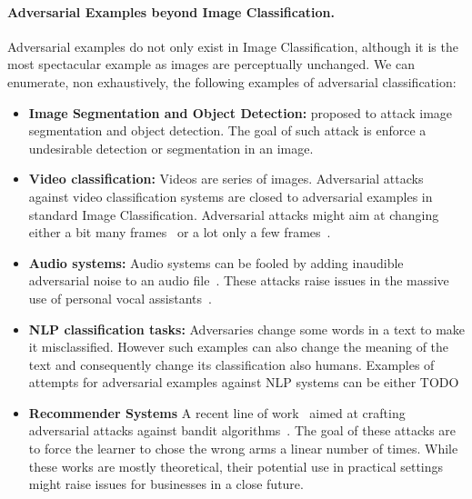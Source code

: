 \paragraph{Adversarial Examples beyond Image Classification.} Adversarial examples do not only exist in Image Classification, although it is the most spectacular example as images are perceptually unchanged. We can enumerate, non exhaustively, the following examples of adversarial classification:
\begin{itemize}
    \item \textbf{Image Segmentation and Object Detection:} \cite{xie2017adversarial} proposed to attack image segmentation and object detection. The goal of such attack is enforce a undesirable detection or segmentation in an image. 
    \item \textbf{Video classification:} Videos are series of images. Adversarial attacks against video classification systems are closed to adversarial examples in standard Image Classification. Adversarial attacks might aim at changing either a bit many frames~\citep{jiang2019black} or a lot only a few frames~\citep{mu2021sparse}. 
    \item \textbf{Audio systems:} Audio systems can be fooled by adding inaudible adversarial noise to an audio file~\citep{carlini2018audio}. These attacks raise issues in the massive use of personal vocal assistants~\citep{zhang2019dangerous}. 
    \item \textbf{NLP classification tasks:} Adversaries change some words in a text to make it misclassified. However such examples can also change the meaning of the text and consequently change its classification also humans. Examples of attempts for adversarial examples against NLP systems can be either TODO
    \item \textbf{Recommender Systems} A recent line of work~\cite{xxx,garcelon2020adversarial} aimed at crafting adversarial attacks against bandit algorithms~\citep{lattimore2018bandit}. The goal of these attacks are to force the learner to chose the wrong arms a linear number of times. While these works are mostly theoretical, their potential use in practical settings might raise issues for businesses in a close future.
\end{itemize}




